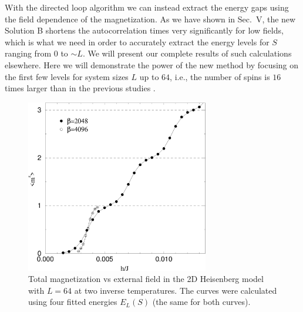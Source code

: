 \documentclass[10pt,pre,aps,twocolumn,showpacs,superscriptaddress,
floatfix]{revtex4}
\begin{document}
With the directed loop algorithm we can instead extract the energy gaps
using the field dependence of the magnetization. As we have shown in
Sec.~V, the new Solution B shortens the autocorrelation times very
significantly for low fields, which is what we need in order to accurately
extract the energy levels for $S$ ranging from $0$ to $\sim L$. We will 
present our complete results of such calculations elsewhere. 
Here we will demonstrate the power of the new method by focusing on the first 
few levels for system sizes $L$ up to $64$, i.e., the number of spins is 
$16$ times larger than in the previous studies \cite{runge,lavalle}.  

\begin{figure}
\includegraphics[clip,width=8cm]{fig29.eps}
\caption{Total magnetization vs external field in the 2D Heisenberg
model with $L=64$ at two inverse temperatures. The curves were calculated
using four fitted energies $E_L(S)$ (the same for both curves).} 
\label{m64}
\end{figure}
\end{document}
